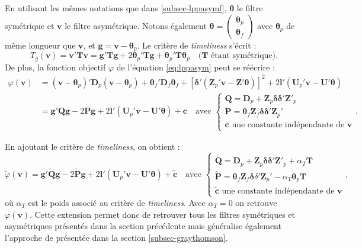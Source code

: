\documentclass[
  12pt,
  a4paper,french]{article}
\newcommand\1{\mathds{1}}
\begin{document}
En utilisant les mêmes notations que dans \ref{subsec-lppasymf}, \(\boldsymbol \theta\) le filtre symétrique et \(\boldsymbol v\) le filtre asymétrique.
Notons également \(\boldsymbol \theta=\begin{pmatrix}\boldsymbol \theta_p\\\boldsymbol \theta_f\end{pmatrix}\) avec \(\boldsymbol \theta_p\) de même longueur que \(\boldsymbol v\), et \(\boldsymbol g=\boldsymbol v-\boldsymbol \theta_p\).
Le critère de \emph{timeliness} s'écrit :
\[
T_g(\boldsymbol v)=\boldsymbol v'\boldsymbol T\boldsymbol v=\boldsymbol g'\boldsymbol T\boldsymbol g+2\boldsymbol \theta_p'\boldsymbol T\boldsymbol g+\boldsymbol \theta_p'\boldsymbol T\boldsymbol \theta_p
\quad(\boldsymbol T\text{ étant symétrique)}.
\]
De plus, la fonction objectif \(\varphi\) de l'équation \eqref{eq:lppasym} peut se réécrire :
\begin{align*}
\varphi(\boldsymbol v)&=(\boldsymbol v-\boldsymbol \theta_p)'\boldsymbol D_{p}(\boldsymbol v-\boldsymbol \theta_p)+
  \boldsymbol \theta_f'\boldsymbol D_{f}\boldsymbol \theta_f+
  [\boldsymbol \delta'(\boldsymbol Z_{p}'\boldsymbol v-\boldsymbol Z'\boldsymbol \theta)]^{2}+
2\boldsymbol l'(\boldsymbol U_{p}'\boldsymbol v-\boldsymbol U'\boldsymbol \theta)\\
&=\boldsymbol g'\boldsymbol Q\boldsymbol g-2\boldsymbol P\boldsymbol g+2\boldsymbol l'(\boldsymbol U_{p}'\boldsymbol v-\boldsymbol U'\boldsymbol \theta)+\boldsymbol c\quad\text{avec }
\begin{cases}
\boldsymbol Q=\boldsymbol D_p+\boldsymbol Z_p\boldsymbol \delta\boldsymbol \delta'\boldsymbol Z'_p \\
\boldsymbol P=\boldsymbol \theta_f\boldsymbol Z_f\boldsymbol \delta\boldsymbol \delta'\boldsymbol Z_p'\\
\boldsymbol c\text{ une constante indépendante de }\boldsymbol v
\end{cases}.
\end{align*}

En ajoutant le critère de \emph{timeliness}, on obtient :
\[
\widetilde\varphi(\boldsymbol v)=\boldsymbol g'\widetilde {\boldsymbol Q}\boldsymbol g-
2\widetilde{\boldsymbol P}\boldsymbol g+2\boldsymbol l'(\boldsymbol U_{p}'\boldsymbol v-\boldsymbol U'\boldsymbol \theta)+
\widetilde{\boldsymbol c}\quad\text{avec }
\begin{cases}
\widetilde{\boldsymbol Q}=\boldsymbol D_p+\boldsymbol Z_p\boldsymbol \delta\boldsymbol \delta'\boldsymbol Z'_p +\alpha_T\boldsymbol T\\
\widetilde{\boldsymbol P}=\boldsymbol \theta_f\boldsymbol Z_f\boldsymbol \delta\delta'\boldsymbol Z_p'-\alpha_T\boldsymbol \theta_p\boldsymbol T\\
\widetilde{\boldsymbol c}\text{ une constante indépendante de }\boldsymbol v
\end{cases},
\]
où \(\alpha_T\) est le poids associé au critère de \emph{timeliness}.
Avec \(\alpha_T=0\) on retrouve \(\varphi(\boldsymbol v)\).
Cette extension permet donc de retrouver tous les filtres symétriques et asymétriques présentés dans la section précédente mais généralise également l'approche de \textcite{GrayThomson1996} présentée dans la section \ref{subsec-graythomson}.
\end{document}
